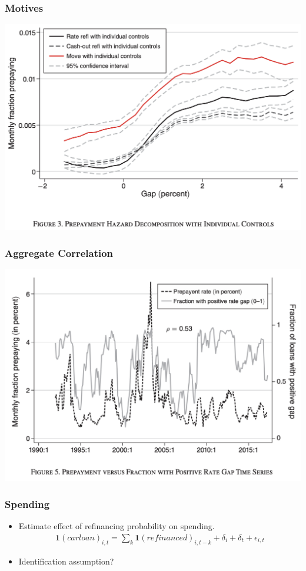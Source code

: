 \documentclass[english,xcolor=svgnames]{beamer}
\begin{document}
\begin{frame}
    \frametitle{Motives}
    \begin{center}
    	\includegraphics[scale=0.3]{figures/BMTVFIG3.png}	
    \end{center}
\end{frame}

\begin{frame}
    \frametitle{Aggregate Correlation}
    \begin{center}
    	\includegraphics[scale=0.3]{figures/BMTVFIG4.png}	
    \end{center}
\end{frame}

\begin{frame}
    \frametitle{Spending}
    \begin{itemize}
    	\item Estimate effect of refinancing probability on spending.
    	\begin{align*}
    	\bm{1}(carloan)_{i,t} = \sum_k \bm{1}(refinanced)_{i,t-k}  + \delta_i + \delta_t + \epsilon_{i,t}
    \end{align*}
    \item Identification assumption?
    \end{itemize}
\end{frame}
\end{document}
